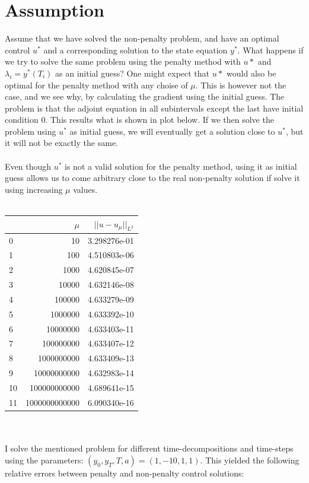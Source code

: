 \documentclass[11pt,a4paper]{report}
\begin{document}
\section{Assumption}
Assume that we have solved the non-penalty problem, and have an optimal control $u^*$ and a corresponding solution to the state equation $y^*$. What happens if we try to solve the same problem using the penalty method with $u*$ and $\lambda_i =y^*(T_i)$ as an initial guess? One might expect that $u*$ would also be optimal for the penalty method with any choise of $\mu$. This is however not the case, and we see why, by calculating the gradient using the initial guess. The problem is that the adjoint equation in all subintervals except the last have initial condition 0. This results what is shown in plot below. If we then solve the problem using $u^*$ as initial guess, we will eventually get a solution close to $u^*$, but it will not be exactly the same.
\\
\\
Even though $u^*$ is not a valid solution for the penalty method, using it as initial guess allows us to come arbitrary close to the real non-penalty solution if solve it using increasing $\mu$ values.
\\
\\ 
\begin{tabular}{lrr}
\toprule
{} &             $\mu$ &    $||u-u_{\mu}||_{L^2}$ \\
\midrule
0  &             10 &  3.298276e-01 \\
1  &            100 &  4.510803e-06 \\
2  &           1000 &  4.620845e-07 \\
3  &          10000 &  4.632146e-08 \\
4  &         100000 &  4.633279e-09 \\
5  &        1000000 &  4.633392e-10 \\
6  &       10000000 &  4.633403e-11 \\
7  &      100000000 &  4.633407e-12 \\
8  &     1000000000 &  4.633409e-13 \\
9  &    10000000000 &  4.632983e-14 \\
10 &   100000000000 &  4.689641e-15 \\
11 &  1000000000000 &  6.090340e-16 \\
\bottomrule
\end{tabular}
\\
\\
I solve the mentioned problem for different time-decompositions and time-steps  using the parameters: $(y_0,y_T,T,a)=(1,-10,1,1)$. This yielded the following relative errors between penalty and non-penalty control solutions:
\end{document}
